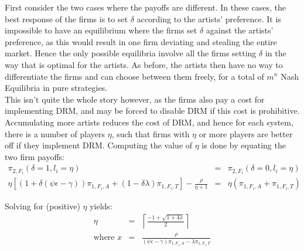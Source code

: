 \documentclass[a4paper,12pt]{article}
\numberwithin{equation}{section}
\newcommand{\firmpayoff}[2]{\pi_{{#1}, F_{#2}}}
\newcommand{\firmalbum}[2]{\pi_{#1, F_{#2}, A}}
\newcommand{\firmticket}[2]{\pi_{#1, F_{#2}, T}}
\newcommand{\drminf}{(\psi \epsilon - \gamma)}
\def\lc{\left\lceil}
\def\rc{\right\rceil}
\begin{document}
First consider the two cases where the payoffs are different. In these cases, the best response of the firms is to set $\delta$ according to the artists' preference. It is impossible to have an equilibrium where the firms set $\delta$ against the artists' preference, as this would result in one firm deviating and stealing the entire market. Hence the only possible equilibria involve all the firms setting $\delta$ in the way that is optimal for the artists. As before, the artists then have no way to differentiate the firms and can choose between them freely, for a total of $m^n$ Nash Equilibria in pure strategies.\\

This isn't quite the whole story however, as the firms also pay a cost for implementing DRM, and may be forced to disable DRM if this cost is prohibitive. Accumulating more artists reduces the cost of DRM, and hence for each system, there is a number of players $\eta$, such that firms with $\eta$ or more players are better off if they implement DRM. Computing the value of $\eta$ is done by equating the two firm payoffs:
\begin{eqnarray*}
\firmpayoff{2}{i}(\delta = 1, l_i = \eta) & = & \firmpayoff{2}{i}(\delta = 0, l_i = \eta)\\
\eta \left[\left(1 + \delta \drminf\right) \firmalbum{1}{i} + (1 - \delta \lambda) \firmticket{1}{i}\right] - \frac{\rho}{\eta + 1} & = & \eta (\firmalbum{1}{i} + \firmticket{1}{i})
\end{eqnarray*}

Solving for (positive) $\eta$ yields:
\begin{eqnarray}
\eta & = & \lc \frac{-1 + \sqrt{1 + 4 x}}{2} \rc \\
\text{where } x & = & \frac{\rho}{\drminf \firmalbum{1}{i} - \lambda \firmticket{1}{i}} \nonumber
\end{eqnarray}
\end{document}
